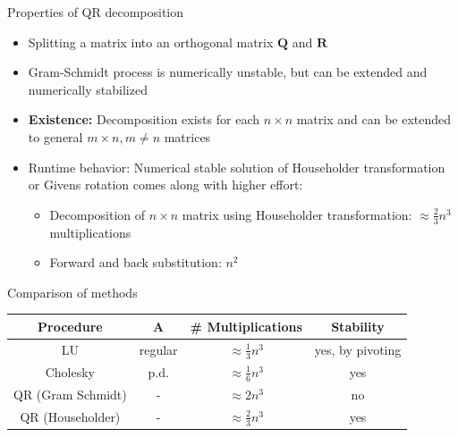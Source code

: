 \documentclass[11pt,compress,t,notes=noshow, xcolor=table]{beamer}
\begin{document}
\begin{vbframe} {Properties of QR decomposition}

\begin{itemize}
\item Splitting a matrix into an orthogonal matrix $\mathbf{Q}$ and $\mathbf{R}$
\item Gram-Schmidt process is numerically unstable, but can be extended and numerically stabilized
\item \textbf{Existence:} Decomposition exists for each $n \times n$ matrix and can be extended to general $m \times n, m \ne n$ matrices
\item Runtime behavior: Numerical stable solution of Householder transformation or Givens rotation comes along with higher effort:
\begin{itemize}
\item Decomposition of $n \times n$ matrix using Householder transformation: $\approx \frac{2}{3}n^3$ multiplications
\item Forward and back substitution: $n^2$
\end{itemize}
\end{itemize}

\end{vbframe}

\begin{vbframe}{Comparison of methods}

\begin{table}
\centering
\begin{tabular}{c|c|c|c}
Procedure & $\mathbf{A}$ & \# Multiplications & Stability \\
\hline
LU & regular & $\approx \frac{1}{3} n^3$ & yes, by pivoting \\
Cholesky & p.d. & $\approx \frac{1}{6}n^3$ & yes \\
QR (Gram Schmidt) & - & $\approx 2n^3$ & no \\
QR (Householder) & - & $\approx \frac{2}{3}n^3$ & yes \\
\end{tabular}
\end{table}


\end{vbframe}
\end{document}
